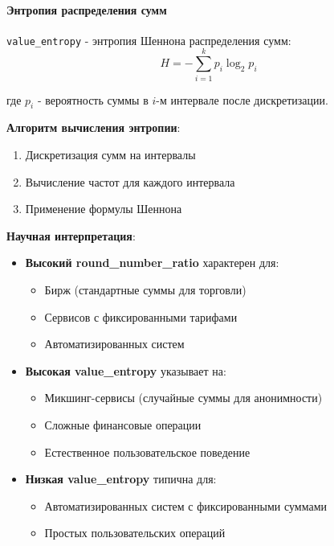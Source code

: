 \paragraph{Энтропия распределения сумм}

\texttt{value\_entropy} - энтропия Шеннона распределения сумм:
\begin{equation}
    H = -\sum_{i=1}^{k} p_i \log_2 p_i
\end{equation}

где $p_i$ - вероятность суммы в $i$-м интервале после дискретизации.

\textbf{Алгоритм вычисления энтропии}:
\begin{enumerate}
    \item Дискретизация сумм на интервалы
    \item Вычисление частот для каждого интервала
    \item Применение формулы Шеннона
\end{enumerate}

\textbf{Научная интерпретация}:
\begin{itemize}
    \item \textbf{Высокий round\_number\_ratio} характерен для:
        \begin{itemize}
            \item Бирж (стандартные суммы для торговли)
            \item Сервисов с фиксированными тарифами
            \item Автоматизированных систем
        \end{itemize}
    \item \textbf{Высокая value\_entropy} указывает на:
        \begin{itemize}
            \item Микшинг-сервисы (случайные суммы для анонимности)
            \item Сложные финансовые операции
            \item Естественное пользовательское поведение
        \end{itemize}
    \item \textbf{Низкая value\_entropy} типична для:
        \begin{itemize}
            \item Автоматизированных систем с фиксированными суммами
            \item Простых пользовательских операций
        \end{itemize}
\end{itemize}

